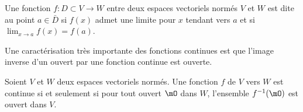 \begin{definition}\label{DefContDansEVN}
	Une fonction $f\colon D\subset V\to W$ entre deux espaces vectoriels normés $V$ et $W$ est dite  au point $a\in\bar D$ si $f(x)$ admet une limite pour $x$ tendant vers $a$ et si $\lim_{x\to a} f(x)=f(a)$.
\end{definition}




Une caractérisation très importante des fonctions continues est que l'image inverse d'un ouvert par une fonction continue est ouverte.

\begin{theorem}		\label{ThoContiueImageInvOUvert}
	Soient $V$ et $W$ deux espaces vectoriels normés. Une fonction $f$ de $V$ vers $W$ est continue si et seulement si pour tout ouvert $\mO$ dans $W$, l'ensemble $f^{-1}(\mO)$ est ouvert dans $V$.
\end{theorem}

